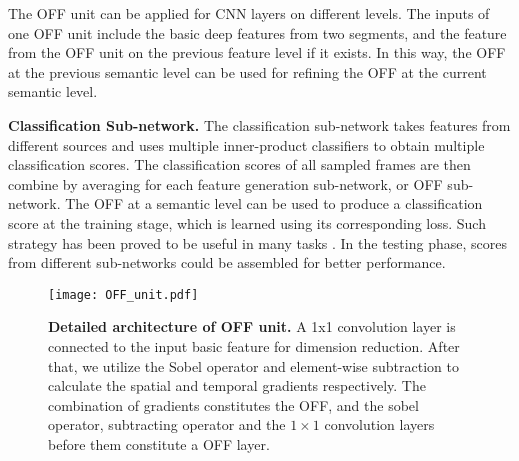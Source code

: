 \documentclass[10pt,twocolumn,letterpaper]{article}
\begin{document}
The OFF unit can be applied for CNN layers on different levels.
 The inputs of one OFF unit include the basic deep features from two segments, and the feature from the OFF unit on the previous feature level if it exists. In this way, the OFF at the previous semantic level can be used for refining the OFF at the current semantic level.
 
  




 
\textbf{Classification Sub-network.}
The classification sub-network takes features from different sources and uses multiple inner-product classifiers to obtain multiple classification scores. The classification scores of all sampled frames are then combine by averaging for each feature generation sub-network, or OFF sub-network. The OFF at a semantic level can be used to produce a classification score at the training stage, which is learned using its corresponding loss. Such strategy has been proved to be useful in many tasks \cite{Szegedycvpr2015googlenet,wei2016cpm,newell2016hourglass}. In the testing phase, scores from different sub-networks could be assembled for better performance.






\begin{figure}[t]
\centering
\texttt{[image: OFF\_unit.pdf]}
\caption{\textbf{Detailed architecture of OFF unit.} A 1x1 convolution layer is connected to the input basic feature for dimension reduction. After that, we utilize the Sobel operator and element-wise subtraction to calculate the spatial and temporal gradients respectively. The combination of gradients constitutes the OFF, and the sobel operator, subtracting operator and the $1\times1$ convolution layers before them constitute a OFF layer.}
\label{fig:fag}
\end{figure}

\vspace{-8px}
\end{document}
